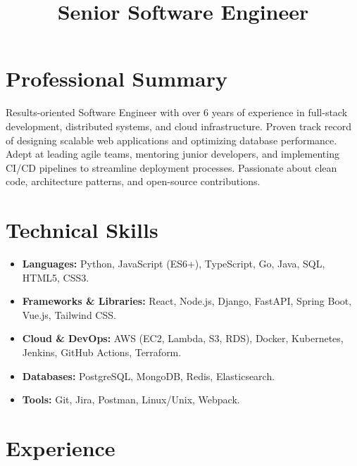 \documentclass[11pt,a4paper,sans]{moderncv}
\title{Senior Software Engineer}
\begin{document}
\makecvtitle

\section{Professional Summary}
Results-oriented Software Engineer with over 6 years of experience in full-stack development, distributed systems, and cloud infrastructure. Proven track record of designing scalable web applications and optimizing database performance. Adept at leading agile teams, mentoring junior developers, and implementing CI/CD pipelines to streamline deployment processes. Passionate about clean code, architecture patterns, and open-source contributions.

\section{Technical Skills}
\begin{itemize}
    \item \textbf{Languages:} Python, JavaScript (ES6+), TypeScript, Go, Java, SQL, HTML5, CSS3.
    \item \textbf{Frameworks \& Libraries:} React, Node.js, Django, FastAPI, Spring Boot, Vue.js, Tailwind CSS.
    \item \textbf{Cloud \& DevOps:} AWS (EC2, Lambda, S3, RDS), Docker, Kubernetes, Jenkins, GitHub Actions, Terraform.
    \item \textbf{Databases:} PostgreSQL, MongoDB, Redis, Elasticsearch.
    \item \textbf{Tools:} Git, Jira, Postman, Linux/Unix, Webpack.
\end{itemize}

\section{Experience}

\end{document}
